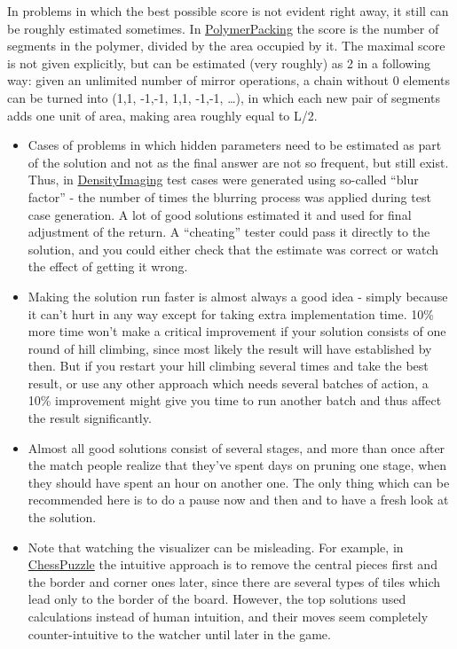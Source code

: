 In problems in which the best possible score is not evident right away,
it still can be roughly estimated sometimes. In
\href{http://www.topcoder.com/longcontest/?module=ViewProblemStatement\&rd=14264\&pm=10918}{PolymerPacking}
the score is the number of segments in the polymer, divided by the area
occupied by it. The maximal score is not given explicitly, but can be
estimated (very roughly) as 2 in a following way: given an unlimited
number of mirror operations, a chain without 0 elements can be turned
into (1,1, -1,-1, 1,1, -1,-1, \ldots{}), in which each new pair of
segments adds one unit of area, making area roughly equal to L/2.

\begin{itemize}
\item
  Cases of problems in which hidden parameters need to be estimated as
  part of the solution and not as the final answer are not so frequent,
  but still exist. Thus, in
  \href{http://www.topcoder.com/longcontest/?module=ViewProblemStatement\&rd=10722\&pm=7548}{DensityImaging}
  test cases were generated using so-called ``blur factor'' - the number
  of times the blurring process was applied during test case generation.
  A lot of good solutions estimated it and used for final adjustment of
  the return. A ``cheating'' tester could pass it directly to the
  solution, and you could either check that the estimate was correct or
  watch the effect of getting it wrong.
\item
  Making the solution run faster is almost always a good idea - simply
  because it can't hurt in any way except for taking extra
  implementation time. 10\% more time won't make a critical improvement
  if your solution consists of one round of hill climbing, since most
  likely the result will have established by then. But if you restart
  your hill climbing several times and take the best result, or use any
  other approach which needs several batches of action, a 10\%
  improvement might give you time to run another batch and thus affect
  the result significantly.
\item
  Almost all good solutions consist of several stages, and more than
  once after the match people realize that they've spent days on pruning
  one stage, when they should have spent an hour on another one. The
  only thing which can be recommended here is to do a pause now and then
  and to have a fresh look at the solution.
\item
  Note that watching the visualizer can be misleading. For example, in
  \href{https://community.topcoder.com/longcontest/?module=ViewProblemStatement\&rd=14195\&pm=10728}{ChessPuzzle}
  the intuitive approach is to remove the central pieces first and the
  border and corner ones later, since there are several types of tiles
  which lead only to the border of the board. However, the top solutions
  used calculations instead of human intuition, and their moves seem
  completely counter-intuitive to the watcher until later in the game.
\end{itemize}

